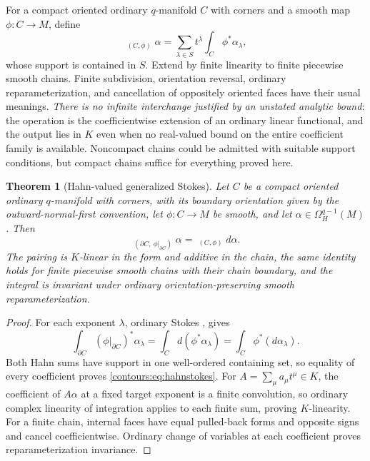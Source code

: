 \documentclass[11pt,letterpaper]{article}
\newtheorem{theorem}{Theorem}[section]
\theoremstyle{definition}
\theoremstyle{remark}
\newcommand{\HInt}{\mathop{\int^{\!H}}\nolimits}
\numberwithin{equation}{section}
\begin{document}
For a compact oriented ordinary $q$-manifold $C$ with corners and a smooth map
$\phi:C\to M$, define
\begin{equation}\label{contours:eq:chainintegral}
  \HInt_{(C,\phi)}\alpha
  =\sum_{\lambda\in S}t^\lambda\int_C\phi^*\alpha_\lambda ,
\end{equation}
whose support is contained in $S$. Extend by finite linearity to finite piecewise
smooth chains. Finite subdivision, orientation reversal, ordinary
reparameterization, and cancellation of oppositely oriented faces have their usual
meanings. \emph{There is no infinite interchange justified by an unstated analytic
bound}: the operation is the coefficientwise extension of an ordinary linear
functional, and the output lies in $K$ even when no real-valued bound on the entire
coefficient family is available. Noncompact chains could be admitted with suitable
support conditions, but compact chains suffice for everything proved here.

\begin{theorem}[Hahn-valued generalized Stokes]\label{contours:thm:hahnstokes}
Let $C$ be a compact oriented ordinary $q$-manifold with corners, with its boundary
orientation given by the outward-normal-first convention, let $\phi:C\to M$ be
smooth, and let $\alpha\in\Omega_H^{q-1}(M)$. Then
\begin{equation}\label{contours:eq:hahnstokes}
 \boxed{\qquad
 \HInt_{(\partial C,\ \phi|_{\partial C})}\alpha
 =\HInt_{(C,\phi)}d\alpha .
 \qquad}
\end{equation}
The pairing is $K$-linear in the form and additive in the chain, the same identity
holds for finite piecewise smooth chains with their chain boundary, and the
integral is invariant under ordinary orientation-preserving smooth
reparameterization.
\end{theorem}
\begin{proof}
For each exponent $\lambda$, ordinary Stokes \cite[Thm.~4.6.1]{GH}, \cite{Lee}
gives
\[
  \int_{\partial C}(\phi|_{\partial C})^*\alpha_\lambda
  =\int_Cd(\phi^*\alpha_\lambda)
  =\int_C\phi^*(d\alpha_\lambda).
\]
Both Hahn sums have support in one well-ordered containing set, so equality of
every coefficient proves \eqref{contours:eq:hahnstokes}. For $A=\sum_\mu a_\mu
t^\mu\in K$, the coefficient of $A\alpha$ at a fixed target exponent is a finite
convolution, so ordinary complex linearity of integration applies to each finite
sum, proving $K$-linearity. For a finite chain, internal faces have equal
pulled-back forms and opposite signs and cancel coefficientwise. Ordinary change of
variables at each coefficient proves reparameterization invariance.
\end{proof}
\end{document}
